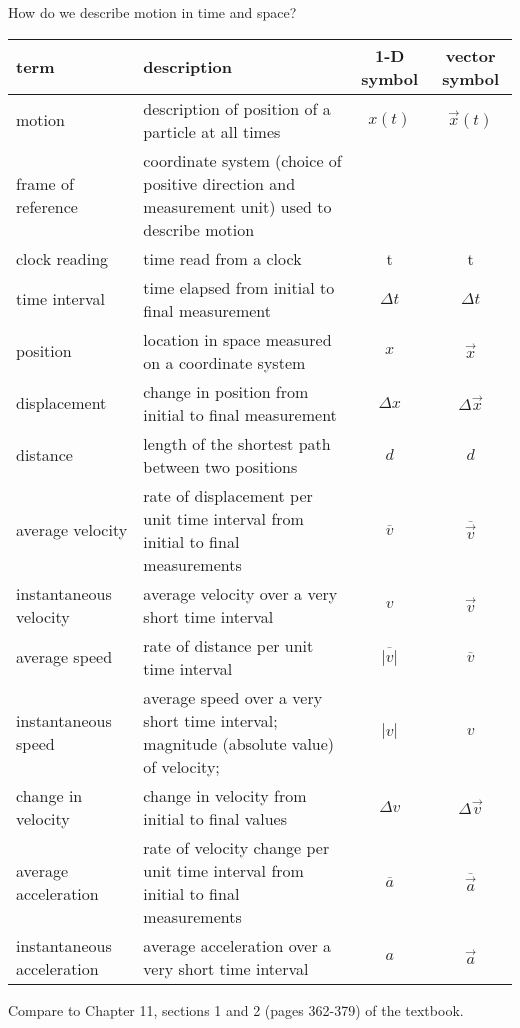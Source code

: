 \documentclass[12pt]{article}
\begin{document}
\begin{center}
How do we describe motion in time and space?
  \begin{tabular}{@{} l>{\raggedright\arraybackslash}p{6cm}cc @{}}
    \toprule
    term & description & 1-D symbol & vector symbol \\ \hline 
    \midrule
    motion & description of position of a particle at all times & $x(t)$ & $\vec{x}(t)$ \\ \hline
    frame of reference & coordinate system (choice of positive direction and measurement unit) used to describe motion & & \\ \hline
    
    clock reading & time read from a clock & t & t \\ \hline 
    time interval & time elapsed from initial to final measurement & $\Delta t$ & $\Delta t$ \\ \hline 
    position & location in space measured on a coordinate system & $x$ & $\vec{x}$ \\ \hline 
    displacement & change in position from initial to final measurement & $\Delta x$ & $\Delta\vec{x}$ \\ \hline 
    distance & length of the shortest path between two positions & $d$ & $d$ \\ \hline 
    average velocity & rate of displacement per unit time interval from initial to final measurements & $\overline{v}$ & $\overline{\vec{v}}$ \\ \hline 
    instantaneous velocity & average velocity over a very short time interval & $v$ & $\vec{v}$ \\ \hline 
    average speed & rate of distance per unit time interval &  $\overline{|v|}$ & $\overline{v}$ \\ \hline
    instantaneous speed & average speed over a very short time interval; magnitude (absolute value) of velocity;  & $|v|$ & $v$ \\ \hline
    change in velocity & change in velocity from initial to final values & $\Delta v$ & $\Delta\vec{v}$ \\ \hline 
    average acceleration & rate of velocity change per unit time interval from initial to final measurements & $\overline{a}$ & $\overline{\vec{a}}$ \\ \hline 
    instantaneous acceleration & average acceleration over a very short time interval & $a$ & $\vec{a}$ \\
    \bottomrule
  \end{tabular}

Compare to Chapter 11, sections 1 and 2 (pages 362-379) of the textbook.
\end{center}
\end{document}
